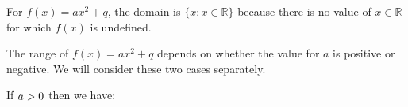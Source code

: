           
          \label{m39345*id242046}For \begin{math}f\left(x\right)=a{x}^{2}+q\end{math}, the domain is \begin{math}\{x:x\in \mathbb{R}\}\end{math} because there is no value of \begin{math}x\in \mathbb{R}\end{math} for which \begin{math}f\left(x\right)\end{math} is undefined.\par 
          \label{m39345*id242145}The range of \begin{math}f\left(x\right)=a{x}^{2}+q\end{math} depends on whether the value for \begin{math}a\end{math} is positive or negative. We will consider these two cases separately.\par 
          \label{m39345*id242193}If \begin{math}a>{}0\end{math} then we have:\par 
          \label{m39345*id242213}\nopagebreak\noindent{}

